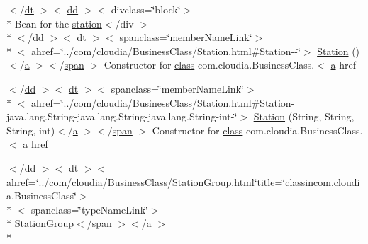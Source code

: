 \begin{DoxyCompactItemize}
$<$/\hyperlink{stylesheet_8css_a107565fb4039d33b041380d6e0ea1d80}{dt} $>$$<$ \hyperlink{stylesheet_8css_a47f4718a86835a7771ec592ece845221}{dd} $>$$<$ divclass=\char`\"{}block\char`\"{}$>$\\*
 Bean for the \hyperlink{nav__app_8js_a71d7bfaa2081410e47cd5a835af1564d}{station}$<$/div $>$\\*
$<$/\hyperlink{stylesheet_8css_a47f4718a86835a7771ec592ece845221}{dd} $>$$<$ \hyperlink{stylesheet_8css_a107565fb4039d33b041380d6e0ea1d80}{dt} $>$$<$ spanclass=\char`\"{}member\-Name\-Link\char`\"{}$>$\\*
$<$ ahref=\char`\"{}../com/cloudia/Business\-Class/Station.\-html\#Station-\/-\/\char`\"{}$>$ \hyperlink{index-17_8html_a8910f6bd064a24ebcfcc0cb1cd5b0c5c}{Station} ()$<$/\hyperlink{style_8css_a5e8981582017bb8b84c21f148345d1f7}{a} $>$$<$/\hyperlink{stylesheet_8css_a8343996ebcf16220b04e54659aac31cc}{span} $>$-\/Constructor for \hyperlink{_tools_8html_acf06f836132665ba8114f5a414c2403f}{class} com.\-cloudia.\-Business\-Class.$<$ \hyperlink{style_8css_a5e8981582017bb8b84c21f148345d1f7}{a} href
\item 
$<$/\hyperlink{stylesheet_8css_a47f4718a86835a7771ec592ece845221}{dd} $>$$<$ \hyperlink{stylesheet_8css_a107565fb4039d33b041380d6e0ea1d80}{dt} $>$$<$ spanclass=\char`\"{}member\-Name\-Link\char`\"{}$>$\\*
$<$ ahref=\char`\"{}../com/cloudia/Business\-Class/Station.\-html\#Station-\/java.\-lang.\-String-\/java.\-lang.\-String-\/java.\-lang.\-String-\/int-\/\char`\"{}$>$ \hyperlink{index-17_8html_ac2375aa22a64908f3538d08a030e35bd}{Station} (String, String, String, int)$<$/\hyperlink{style_8css_a5e8981582017bb8b84c21f148345d1f7}{a} $>$$<$/\hyperlink{stylesheet_8css_a8343996ebcf16220b04e54659aac31cc}{span} $>$-\/Constructor for \hyperlink{_tools_8html_acf06f836132665ba8114f5a414c2403f}{class} com.\-cloudia.\-Business\-Class.$<$ \hyperlink{style_8css_a5e8981582017bb8b84c21f148345d1f7}{a} href
\item 
$<$/\hyperlink{stylesheet_8css_a47f4718a86835a7771ec592ece845221}{dd} $>$$<$ \hyperlink{stylesheet_8css_a107565fb4039d33b041380d6e0ea1d80}{dt} $>$$<$ ahref=\char`\"{}../com/cloudia/Business\-Class/Station\-Group.\-html\char`\"{}title=\char`\"{}classincom.\-cloudia.\-Business\-Class\char`\"{}$>$\\*
$<$ spanclass=\char`\"{}type\-Name\-Link\char`\"{}$>$\\*
 Station\-Group$<$/\hyperlink{stylesheet_8css_a8343996ebcf16220b04e54659aac31cc}{span} $>$$<$/\hyperlink{style_8css_a5e8981582017bb8b84c21f148345d1f7}{a} $>$\\*
$$
\end{DoxyCompactItemize}
